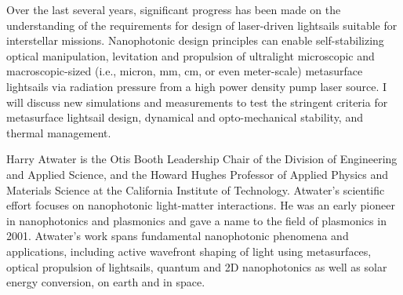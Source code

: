 \documentclass[a4paper,parskip,10pt]{scrartcl}
\begin{document}
    \begin{tcolorbox}[
        enhanced,
        title={Keynote Lecture 6: Harry Atwater (California Institute of Technology) \\  StarShot \textemdash~from physics to spacecraft},
        sharp corners,
        colbacktitle=thistrack,
        fonttitle=\large\mediumfont,
        boxsep=0pt,
        boxrule=0pt,
        left*=0pt,
        lefttitle=4mm,
        toptitle=4mm,
        bottomtitle=4mm,
        top=0pt,
        bottom=0pt,
        sidebyside,
        sidebyside align=center,
        lefthand width=6cm,
        segmentation empty,
    ]%
        
        \tcblower

        \setlength{\parskip}{1ex}
        
        \vspace{1ex}
        Over the last several years, significant progress has been made on the understanding of the requirements for design of laser-driven lightsails suitable for interstellar missions. Nanophotonic design principles can enable self-stabilizing optical manipulation, levitation and propulsion of ultralight microscopic and macroscopic-sized (i.e., micron, mm, cm, or even meter-scale) metasurface lightsails via radiation pressure from a high power density pump laser source. I will discuss new simulations and measurements to test the stringent criteria for metasurface lightsail design, dynamical and opto-mechanical stability, and thermal management.

        {
            \small
            \color{white!20!black}
            Harry Atwater is the Otis Booth Leadership Chair of the Division of Engineering and Applied Science, and the Howard Hughes Professor of Applied Physics and Materials Science at the California Institute of Technology. Atwater's scientific effort focuses on nanophotonic light-matter interactions. He was an early pioneer in nanophotonics and plasmonics and gave a name to the field of plasmonics in 2001. Atwater's work spans fundamental nanophotonic phenomena and applications, including active wavefront shaping of light using metasurfaces, optical propulsion of lightsails, quantum and 2D nanophotonics as well as solar energy conversion, on earth and in space.}


\end{tcolorbox}
\end{document}
